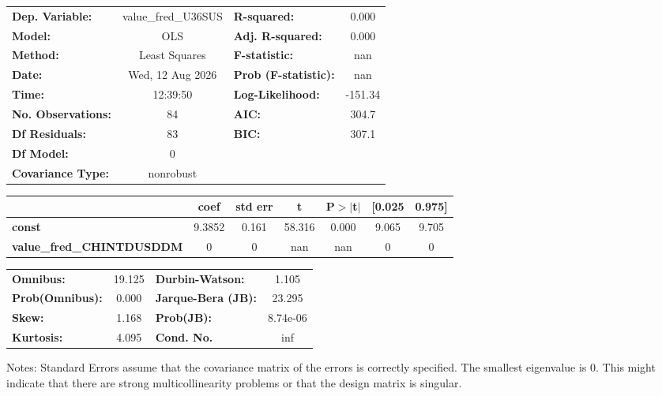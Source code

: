 \begin{center}
\begin{tabular}{lclc}
\toprule
\textbf{Dep. Variable:}           & value\_fred\_U36SUS & \textbf{  R-squared:         } &     0.000   \\
\textbf{Model:}                   &         OLS         & \textbf{  Adj. R-squared:    } &     0.000   \\
\textbf{Method:}                  &    Least Squares    & \textbf{  F-statistic:       } &       nan   \\
\textbf{Date:}                    &   Wed, 12 Aug 2026  & \textbf{  Prob (F-statistic):} &      nan    \\
\textbf{Time:}                    &       12:39:50      & \textbf{  Log-Likelihood:    } &   -151.34   \\
\textbf{No. Observations:}        &            84       & \textbf{  AIC:               } &     304.7   \\
\textbf{Df Residuals:}            &            83       & \textbf{  BIC:               } &     307.1   \\
\textbf{Df Model:}                &             0       & \textbf{                     } &             \\
\textbf{Covariance Type:}         &      nonrobust      & \textbf{                     } &             \\
\bottomrule
\end{tabular}
\begin{tabular}{lcccccc}
                                  & \textbf{coef} & \textbf{std err} & \textbf{t} & \textbf{P$> |$t$|$} & \textbf{[0.025} & \textbf{0.975]}  \\
\midrule
\textbf{const}                    &       9.3852  &        0.161     &    58.316  &         0.000        &        9.065    &        9.705     \\
\textbf{value\_fred\_CHINTDUSDDM} &            0  &            0     &       nan  &           nan        &            0    &            0     \\
\bottomrule
\end{tabular}
\begin{tabular}{lclc}
\textbf{Omnibus:}       & 19.125 & \textbf{  Durbin-Watson:     } &    1.105  \\
\textbf{Prob(Omnibus):} &  0.000 & \textbf{  Jarque-Bera (JB):  } &   23.295  \\
\textbf{Skew:}          &  1.168 & \textbf{  Prob(JB):          } & 8.74e-06  \\
\textbf{Kurtosis:}      &  4.095 & \textbf{  Cond. No.          } &      inf  \\
\bottomrule
\end{tabular}
\end{center}

Notes: \newline
 [1] Standard Errors assume that the covariance matrix of the errors is correctly specified. \newline
 [2] The smallest eigenvalue is      0. This might indicate that there are \newline
 strong multicollinearity problems or that the design matrix is singular.